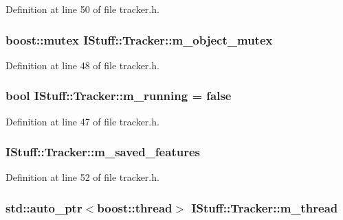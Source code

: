 Definition at line 50 of file tracker.\-h.

\hypertarget{class_i_stuff_1_1_tracker_a71c26a9c9d53b53cd3e6f46bfb9e1af1}{
\subsubsection[{m\-\_\-object\-\_\-mutex}]{\setlength{\rightskip}{0pt plus 5cm}boost\-::mutex I\-Stuff\-::\-Tracker\-::m\-\_\-object\-\_\-mutex\hspace{0.3cm}{\ttfamily [private]}}}\label{class_i_stuff_1_1_tracker_a71c26a9c9d53b53cd3e6f46bfb9e1af1}


Definition at line 48 of file tracker.\-h.

\hypertarget{class_i_stuff_1_1_tracker_a6859d6a02fe907e0dcc1b48b79ba0d9d}{
\subsubsection[{m\-\_\-running}]{\setlength{\rightskip}{0pt plus 5cm}bool I\-Stuff\-::\-Tracker\-::m\-\_\-running = false\hspace{0.3cm}{\ttfamily [private]}}}\label{class_i_stuff_1_1_tracker_a6859d6a02fe907e0dcc1b48b79ba0d9d}


Definition at line 47 of file tracker.\-h.

\hypertarget{class_i_stuff_1_1_tracker_a72081a14f4eb1193fa9800a1e37e0100}{
\subsubsection[{m\-\_\-saved\-\_\-features}]{ I\-Stuff\-::\-Tracker\-::m\-\_\-saved\-\_\-features\hspace{0.3cm}{\ttfamily [private]}}}\label{class_i_stuff_1_1_tracker_a72081a14f4eb1193fa9800a1e37e0100}


Definition at line 52 of file tracker.\-h.

\hypertarget{class_i_stuff_1_1_tracker_a76bb227e8681e75c9d7edd561e231ab6}{
\subsubsection[{m\-\_\-thread}]{\setlength{\rightskip}{0pt plus 5cm}std\-::auto\-\_\-ptr$<$boost\-::thread$>$ I\-Stuff\-::\-Tracker\-::m\-\_\-thread\hspace{0.3cm}{\ttfamily [private]}}}\label{class_i_stuff_1_1_tracker_a76bb227e8681e75c9d7edd561e231ab6}


